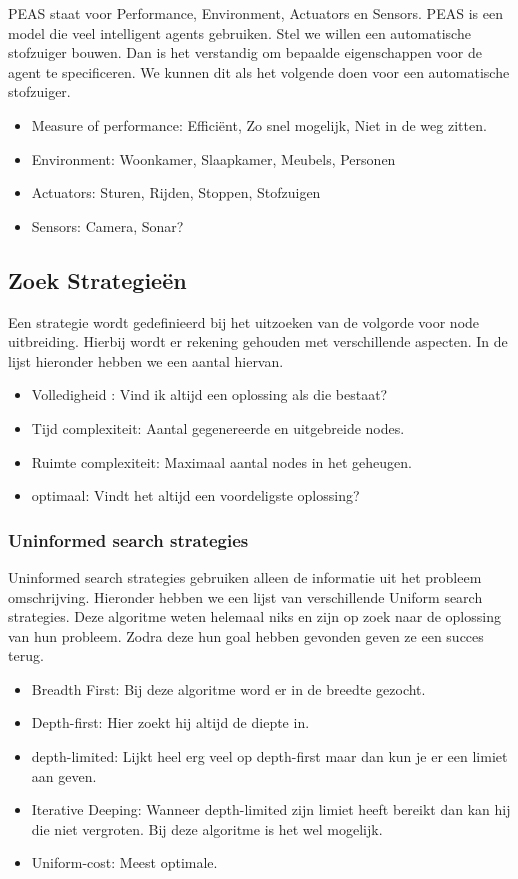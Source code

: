 \documentclass{article}
\begin{document}
PEAS staat voor Performance, Environment, Actuators en Sensors. PEAS is een model die veel intelligent agents gebruiken. Stel we willen een automatische stofzuiger bouwen. Dan is het verstandig om bepaalde eigenschappen voor de agent te specificeren. We kunnen dit als het volgende doen voor een automatische stofzuiger.

\begin{itemize}
    \item Measure of performance: Efficiënt, Zo snel mogelijk, Niet in de weg zitten.
    \item Environment: Woonkamer, Slaapkamer, Meubels, Personen
    \item Actuators: Sturen, Rijden, Stoppen, Stofzuigen
    \item Sensors: Camera, Sonar?
\end{itemize}

\subsection{Zoek Strategieën}
Een strategie wordt gedefinieerd bij het uitzoeken van de volgorde voor node uitbreiding. Hierbij wordt er rekening gehouden met verschillende aspecten. In de lijst hieronder hebben we een aantal hiervan.

\begin{itemize}
    \item Volledigheid : Vind ik altijd een oplossing als die bestaat?
    \item Tijd complexiteit: Aantal gegenereerde en uitgebreide nodes.
    \item Ruimte complexiteit: Maximaal aantal nodes in het geheugen.
    \item optimaal: Vindt het altijd een voordeligste oplossing?
\end{itemize}

\subsubsection{Uninformed search strategies}
Uninformed search strategies gebruiken alleen de informatie uit het probleem omschrijving. Hieronder hebben we een lijst van verschillende Uniform search strategies. Deze algoritme weten helemaal niks en zijn op zoek naar de oplossing van hun probleem. Zodra deze hun goal hebben gevonden geven ze een succes terug\cite{uss}.

\begin{itemize}
    \item Breadth First: Bij deze algoritme word er in de breedte gezocht.
    \item Depth-first: Hier zoekt hij altijd de diepte in.
    \item depth-limited: Lijkt heel erg veel op depth-first maar dan kun je er een limiet aan geven.
    \item Iterative Deeping: Wanneer depth-limited zijn limiet heeft bereikt dan kan hij die niet vergroten. Bij deze algoritme is het wel mogelijk.
    \item Uniform-cost: Meest optimale.
\end{itemize}
\end{document}
